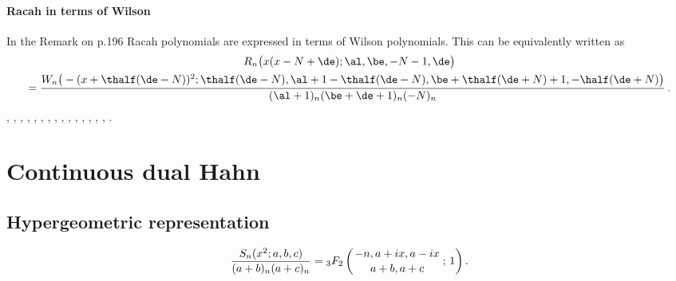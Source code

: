 \documentclass[envcountchap,graybox]{svmono}
\newcommand{\hyp}[5]{\mbox{}_{#1}{F}_{#2}
\left(\genfrac{}{}{0pt}{}{#3}{#4}\,;\,#5\right)}
\begin{document}
\paragraph{Racah in terms of Wilson}
In the Remark on p.196 Racah polynomials are expressed in terms of
Wilson polynomials. This can be equivalently written as
\begin{multline}
R_n\big(x(x-N+\de);\al,\be,-N-1,\de\big)\\
=\frac{W_n\big(-(x+\thalf(\de-N))^2;\thalf(\de-N),\al+1-\thalf(\de-N),
\be+\thalf(\de+N)+1,-\half(\de+N)\big)}
{(\al+1)_n (\be+\de+1)_n (-N)_n}\,.
\label{146}
\end{multline}
%
\cite{Askey89I}, \cite{AskeyWilson79}, \cite{AskeyWilson85},
\cite{AtakRahmanSuslov}, \cite{AtakSuslov88}, \cite{Dunkl84},
\cite{Koorn88}, \cite{Lesky93}, \cite{Lesky95II}, \cite{LeskyWaibel},
\cite{Nikiforov+}, \cite{NikiforovUvarov}, \cite{Perlstadt}, \cite{Rahman80}, 
\cite{Rahman81II}, \cite{Wilson80}.


\section{Continuous dual Hahn}

\par\setcounter{equation}{0}

\subsection*{Hypergeometric representation}
\begin{equation}
\label{DefContDualHahn}
\frac{S_n(x^2;a,b,c)}{(a+b)_n(a+c)_n}=\hyp{3}{2}{-n,a+ix,a-ix}{a+b,a+c}{1}.
\end{equation}
\end{document}
